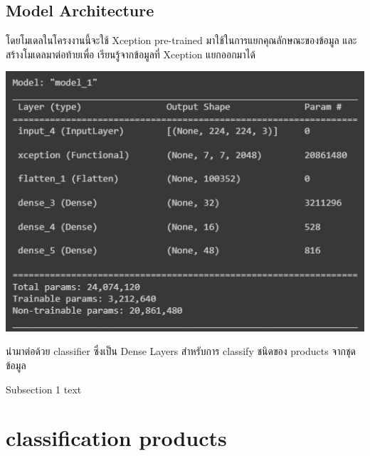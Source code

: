  
  
\subsection{Model Architecture}
โดยโมเดลในโครงงานนี้จะใช้ Xception pre-trained มาใช้ในการแยกคุณลักษณะของข้อมูล  และสร้างโมเดลมาต่อท้ายเพื่อ เรียนรู้จากข้อมูลที่ Xception แยกออกมาได้
\begin{center}
  \includegraphics[scale=0.45]{pic/model.png}
\end{center}
  
นำมาต่อด้วย classifier ซึ่งเป็น Dense Layers สำหรับการ classify ชนิดของ products จากชุดข้อมูล


 

 

Subsection 1 text

\section{classification products}

